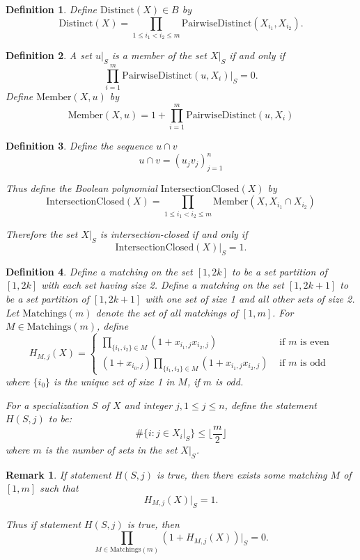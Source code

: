 \documentclass[10pt,a4paper]{amsart}
\newtheorem{definition}{Definition}
\newtheorem{remark}{Remark}
\begin{document}
\begin{definition} 

Define $\mathrm{Distinct}(X)  \in B$ by
$$
\mathrm{Distinct}(X) =\prod_{1 \leq i_1<i_2 \leq m}\mathrm{PairwiseDistinct}(X_{i_1},X_{i_2}). 
$$
\end{definition} 

\begin{definition} 
A set $u|_S$ is a member of the set $X|_S$ if and only if 
$$
\prod_{i=1}^m \mathrm{PairwiseDistinct}(u,X_i)|_S = 0.
$$ 
Define $\mathrm{Member}(X,u)$ by 
$$
\mathrm{Member}(X,u) = 1+ \prod_{i=1}^m \mathrm{PairwiseDistinct}(u,X_i)
$$
\end{definition} 

\begin{definition} 

Define the sequence $u \cap v$ 
$$
u \cap v= (u_jv_j)_{j=1}^n
$$

Thus define the Boolean polynomial $\mathrm{IntersectionClosed}(X)$ by 
$$
\mathrm{IntersectionClosed}(X) = \prod_{1 \leq i_1<i_2 \leq m}\mathrm{Member}(X,X_{i_1} \cap X_{i_2}) 
$$

Therefore the set $X|_S$ is intersection-closed if and only if 
$$
\mathrm{IntersectionClosed}(X)|_S = 1.
$$
\end{definition} 

\begin{definition} 
Define a matching on the set $[1,2k]$ to be a set partition of $[1,2k]$ with each set having size 2. Define a matching on the set $[1,2k+1]$ to be a set partition of $[1,2k+1]$ with one set of size 1 and all other sets of size 2. Let $\mathrm{Matchings}(m)$ denote the set of all matchings of $[1,m]$. For $M \in  \mathrm{Matchings}(m)$, define
$$
H_{M,j}(X) = \begin{cases} \prod_{\{ i_1,i_2\} \in M} (1+ x_{i_1,j}x_{i_2,j}) &\text{ if $m$ is even} \\ 
(1+x_{i_0, j})\prod_{\{ i_1,i_2\} \in M} (1+ x_{i_1,j}x_{i_2,j}) &\text{ if $m$ is odd} 
\end{cases}
$$
where $\{i_0\}$ is the unique set of size 1 in $M$, if $m$ is odd. 

For a specialization $S$ of $X$ and integer $j, 1 \leq j \leq n$, define the statement $H(S,j)$ to be: 
\[
\#\{ i \colon j \in X_i|_S\} \leq  \lfloor \frac{m}{2}\rfloor
\]
 where $m$ is the number of sets in the set $X|_S$. 
\end{definition}

\begin{remark}If statement H$(S,j)$ is true, then there exists some matching $M$ of $[1,m]$ such that  
$$
H_{M,j}(X)|_S = 1.
$$

Thus if statement $H(S,j)$ is true, then 
$$
\prod_{M \in \mathrm{Matchings}(m)} (1+H_{M,j}(X))|_S=0. 
$$
\end{remark}
\end{document}
